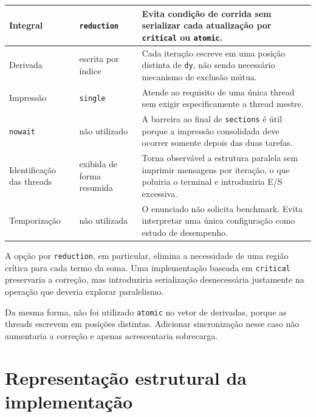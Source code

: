 \begin{table}[htbp]
\begin{tabular}{
        |p{}
        |p{}
        |p{}|}
        Integral &
        \texttt{reduction} &
        Evita condição de corrida sem serializar cada atualização por
        \texttt{critical} ou \texttt{atomic}. \\
        \hline

        Derivada &
        escrita por índice &
        Cada iteração escreve em uma posição distinta de \texttt{dy}, não
        sendo necessário mecanismo de exclusão mútua. \\
        \hline

        Impressão &
        \texttt{single} &
        Atende ao requisito de uma única thread sem exigir especificamente a
        thread mestre. \\
        \hline

        \texttt{nowait} &
        não utilizado &
        A barreira ao final de \texttt{sections} é útil porque a impressão
        consolidada deve ocorrer somente depois das duas tarefas. \\
        \hline

        Identificação das threads &
        exibida de forma resumida &
        Torna observável a estrutura paralela sem imprimir mensagens por
        iteração, o que poluiria o terminal e introduziria E/S excessiva. \\
        \hline

        Temporização &
        não utilizada &
        O enunciado não solicita benchmark. Evita interpretar uma única
        configuração como estudo de desempenho. \\
        \hline

    \end{tabular}
\end{table}

A opção por \texttt{reduction}, em particular, elimina a necessidade de uma
região crítica para cada termo da soma. Uma implementação baseada em
\texttt{critical} preservaria a correção, mas introduziria serialização
desnecessária justamente na operação que deveria explorar paralelismo.

Da mesma forma, não foi utilizado \texttt{atomic} no vetor de derivadas,
porque as threads escrevem em posições distintas. Adicionar sincronização
nesse caso não aumentaria a correção e apenas acrescentaria sobrecarga.


\section{Representação estrutural da implementação}
\label{sec:atvd08-estrutura}

